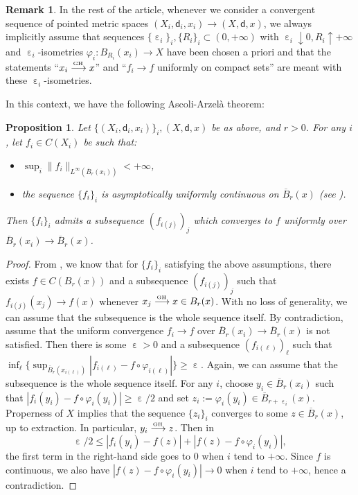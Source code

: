 \documentclass[JEP,XML,SOM,Unicode,published]{cedram}
\def\To#1{\mathchoice{\xrightarrow{\textstyle\kern4pt#1\kern3pt}}{\stackrel{#1}{\longrightarrow}}{}{}}
\newcommand{\sGH}{{\scriptscriptstyle\mathrm{GH}\,}}
\theoremstyle{plain}
\newtheorem{proposition}[theorem]{Proposition}
\theoremstyle{definition}
\newtheorem{remark}[theorem]{Remark}
\let\eps\upepsilon
\let\phi\varphi
\newcommand{\dist}{\mathsf{d}}
\begin{document}
\begin{remark}
In the rest of the article, whenever we consider a convergent sequen\-ce of pointed metric spaces $(X_i,\dist_i,x_i) \to (X,\dist,x)$, we always implicitly assume that sequences $\{\eps_i\}_i, \{R_i\}_i \subset (0,+\infty)$ with $\eps_i\downarrow 0, R_i \uparrow +\infty$ and $\eps_i$-isometries $\phi_i:B_{R_i}(x_i)\to X$ have been chosen a priori and that the statements ``$x_i \To{\sGH} x$'' and ``$f_i \to f$ uniformly on compact sets'' are meant with these $\eps_i$-isometries.
\end{remark}

In this context, we have the following Ascoli-Arzelà theorem:

\begin{proposition}\label{prop:AA1}
Let $\{(X_i,\dist_i,x_i)\}_i, (X,\dist,x)$ be as above, and $r>0$. For any $i$, let $f_i \in C(X_i)$ be such that:
\begin{itemize}
\item $\sup_i \|f_i\|_{L^{\infty}(\overline{B}_r(x_i))} < +\infty$,
\item the sequence $\{f_i\}_i$ is asymptotically uniformly continuous on $\overline{B}_r(x)$ (see \cite[Def.\,3.2]{Honda}).
\end{itemize}
Then $\{f_i\}_i$ admits a subsequence $(f_{i(j)})_j$ which converges to $f$ uniformly over $\overline{B}_r(x_i) \to \overline{B}_r(x)$.
\end{proposition}

\begin{proof}
From \cite[Prop.\,3.3]{Honda}, we know that for $\{f_i\}_i$ satisfying the above assumptions, there exists $f \in C(B_r(x))$ and a subsequence $(f_{i(j)})_j$ such that $f_{i(j)}(x_j) \to f(x)$ whenever $x_j \To{\sGH} x \in B_r(x)$. With no loss of generality, we can assume that the subsequence is the whole sequence itself. By contradiction, assume that the uniform convergence $f_i\to f$ over $\overline{B}_r(x_i)\to \overline{B}_r(x)$ is not satisfied. Then there is some $\eps>0$ and a subsequence $(f_{i(\ell)})_\ell$ such that $\inf_\ell \{\sup_{\overline{B}_r(x_{i(\ell)})} |f_{i(\ell)}-f \circ \phi_{i(\ell)}|\} \ge \eps$. Again, we can assume that the subsequence is the whole sequence itself. For any $i$, choose $y_i \in \overline{B}_r(x_i)$ such that $|f_i(y_i)-f \circ \phi_i(y_i)| \ge \eps/2$ and set $z_i:=\phi_i(y_i) \in \overline{B}_{r+\eps_i}(x)$. Properness of $X$ implies that the sequence $\{z_i\}_i$ converges to some $z \in \overline{B}_r(x)$, up to extraction. In particular, $y_i \To{\sGH} z$. Then in
\[
\eps/2 \le |f_i(y_i)-f(z)| + |f(z)-f\circ \phi_i(y_i)|,
\]
the first term in the right-hand side goes to $0$ when $i$ tend to $+\infty$. Since $f$ is continuous, we also have $|f(z)-f\circ \phi_i(y_i)|\to 0$ when $i$ tend to $+\infty$, hence a contradiction.
\end{proof}
\end{document}
